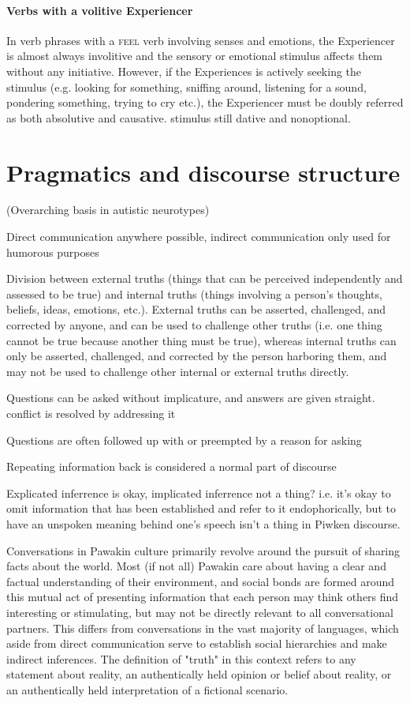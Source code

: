 \documentclass[smallroyalvopaper,9pt]{memoir} %
\newcommand{\langeng}{Pawakin}
\begin{document}
\subsubsection{Verbs with a volitive Experiencer}

In verb phrases with a \textsc{feel} verb involving senses and emotions, the Experiencer is almost always involitive and the sensory or emotional stimulus affects them without any initiative. However, if the Experiences is actively seeking the stimulus (e.g. looking for something, sniffing around, listening for a sound, pondering something, trying to cry etc.), the Experiencer must be doubly referred as both absolutive and causative. stimulus still dative and nonoptional.

\chapter{Pragmatics and discourse structure}

(Overarching basis in autistic neurotypes)

Direct communication anywhere possible, indirect communication only used for humorous purposes

Division between external truths (things that can be perceived independently and assessed to be true) and internal truths (things involving a person's thoughts, beliefs, ideas, emotions, etc.). External truths can be asserted, challenged, and corrected by anyone, and can be used to challenge other truths (i.e. one thing cannot be true because another thing must be true), whereas internal truths can only be asserted, challenged, and corrected by the person harboring them, and may not be used to challenge other internal or external truths directly.

Questions can be asked without implicature, and answers are given straight. conflict is resolved by addressing it

Questions are often followed up with or preempted by a reason for asking

Repeating information back is considered a normal part of discourse

Explicated inferrence is okay, implicated inferrence not a thing? i.e. it's okay to omit information that has been established and refer to it endophorically, but to have an unspoken meaning behind one's speech isn't a thing in Piwken discourse.

Conversations in \langeng{} culture primarily revolve around the pursuit of sharing facts about the world. Most (if not all) \langeng{} care about having a clear and factual understanding of their environment, and social bonds are formed around this mutual act of presenting information that each person may think others find interesting or stimulating, but may not be directly relevant to all conversational partners. This differs from conversations in the vast majority of languages, which aside from direct communication serve to establish social hierarchies and make indirect inferences. The definition of "truth" in this context refers to any statement about reality, an authentically held opinion or belief about reality, or an authentically held interpretation of a fictional scenario. 
\end{document}
